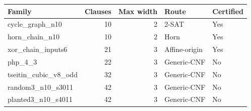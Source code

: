 \begin{tabular}{lrrll}
\toprule
Family & Clauses & Max width & Route & Certified \\
\midrule
cycle\_graph\_n10 & 10 & 2 & 2-SAT & Yes \\
horn\_chain\_n10 & 10 & 2 & Horn & Yes \\
xor\_chain\_inputs6 & 21 & 3 & Affine-origin & Yes \\
php\_4\_3 & 22 & 3 & Generic-CNF & No \\
tseitin\_cubic\_v8\_odd & 32 & 3 & Generic-CNF & No \\
random3\_n10\_s3011 & 42 & 3 & Generic-CNF & No \\
planted3\_n10\_s4011 & 42 & 3 & Generic-CNF & No \\
\bottomrule
\end{tabular}